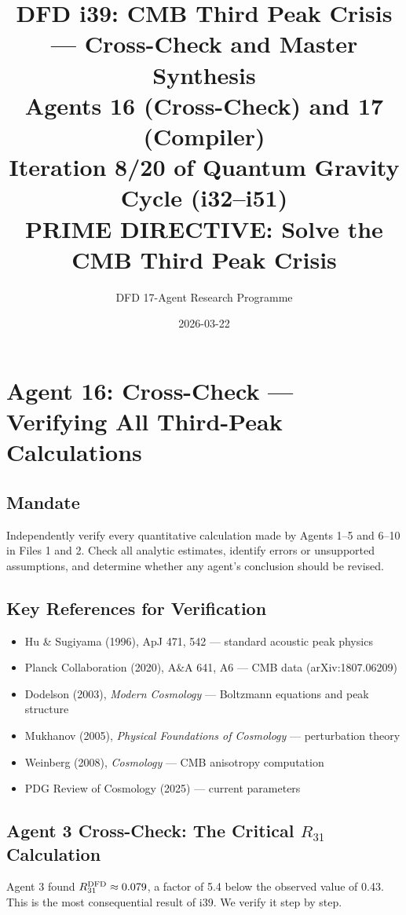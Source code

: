 \documentclass[11pt,a4paper]{article}
\title{DFD i39: CMB Third Peak Crisis --- Cross-Check and Master Synthesis\\[6pt]
\large Agents 16 (Cross-Check) and 17 (Compiler)\\[6pt]
\normalsize Iteration 8/20 of Quantum Gravity Cycle (i32--i51)\\
PRIME DIRECTIVE: Solve the CMB Third Peak Crisis}
\author{DFD 17-Agent Research Programme}
\date{2026-03-22}
\begin{document}
\maketitle
\tableofcontents
\newpage

\section{Agent 16: Cross-Check --- Verifying All Third-Peak Calculations}
\label{sec:agent16}

\subsection{Mandate}

Independently verify every quantitative calculation made by Agents 1--5 and 6--10 in Files 1 and 2. Check all analytic estimates, identify errors or unsupported assumptions, and determine whether any agent's conclusion should be revised.

\subsection{Key References for Verification}

\begin{itemize}
\item Hu \& Sugiyama (1996), ApJ 471, 542 --- standard acoustic peak physics
\item Planck Collaboration (2020), A\&A 641, A6 --- CMB data (arXiv:1807.06209)
\item Dodelson (2003), \emph{Modern Cosmology} --- Boltzmann equations and peak structure
\item Mukhanov (2005), \emph{Physical Foundations of Cosmology} --- perturbation theory
\item Weinberg (2008), \emph{Cosmology} --- CMB anisotropy computation
\item PDG Review of Cosmology (2025) --- current parameters
\end{itemize}

\subsection{Agent 3 Cross-Check: The Critical $R_{31}$ Calculation}

Agent 3 found $R_{31}^{\rm DFD} \approx 0.079$, a factor of 5.4 below the observed value of 0.43. This is the most consequential result of i39. We verify it step by step.
\end{document}

